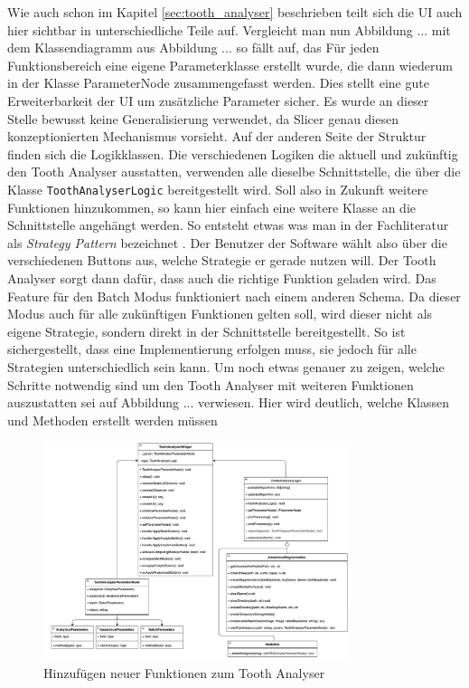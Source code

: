 Wie auch schon im Kapitel \ref{sec:tooth_analyser} beschrieben teilt sich die
\ac{UI} auch hier sichtbar in unterschiedliche Teile auf. Vergleicht man nun
Abbildung ... mit dem Klassendiagramm aus Abbildung ... so fällt auf, das Für jeden
Funktionsbereich eine eigene Parameterklasse erstellt wurde, die dann wiederum
in der Klasse ParameterNode zusammengefasst werden. Dies stellt eine gute Erweiterbarkeit
der \ac{UI} um zusätzliche Parameter sicher. Es wurde an dieser Stelle bewusst keine
Generalisierung verwendet, da Slicer genau diesen konzeptionierten Mechanismus
vorsieht. Auf der anderen Seite der Struktur finden sich die Logikklassen. Die
verschiedenen Logiken die aktuell und zukünftig den Tooth Analyser ausstatten, verwenden
alle dieselbe Schnittstelle, die über die Klasse \texttt{ToothAnalyserLogic} bereitgestellt
wird. Soll also in Zukunft weitere Funktionen hinzukommen, so kann hier einfach eine
weitere Klasse an die Schnittstelle angehängt werden. So entsteht etwas was man
in der Fachliteratur als \textit{Strategy Pattern} bezeichnet \citep[vgl.][S. ...]{siebler2014}.
Der Benutzer der Software wählt also über die verschiedenen Buttons aus, welche
Strategie er gerade nutzen will. Der Tooth Analyser sorgt dann dafür, dass auch
die richtige Funktion geladen wird. Das Feature für den Batch Modus funktioniert
nach einem anderen Schema. Da dieser Modus auch für alle zukünftigen Funktionen
gelten soll, wird dieser nicht als eigene Strategie, sondern direkt in der
Schnittstelle bereitgestellt. So ist sichergestellt, dass eine Implementierung
erfolgen muss, sie jedoch für alle Strategien unterschiedlich sein kann. Um noch
etwas genauer zu zeigen, welche Schritte notwendig sind um den Tooth Analyser mit
weiteren Funktionen auszustatten sei auf Abbildung ... verwiesen. Hier wird
deutlich, welche Klassen und Methoden erstellt werden müssen

\begin{figure}[h]
	\centering
	\includegraphics[width=0.8\textwidth]{img/toothAnalyserClasses.png}
	\caption{Hinzufügen neuer Funktionen zum Tooth Analyser}
	\label{fig:klassendiagramm_new}
\end{figure}

